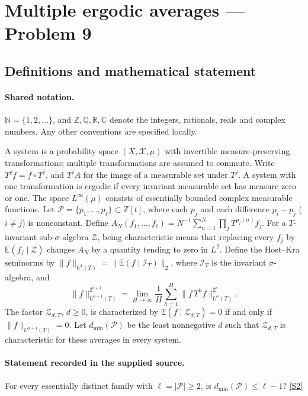 \documentclass[11pt]{article}
\newcommand{\sref}[2]{\hyperlink{source:#1:#2}{[S#2]}}
\begin{document}
\section{Multiple ergodic averages — Problem 9}\label{statement}

\subsection{Definitions and mathematical statement}

\paragraph{Shared notation.}$\mathbb N=\{1,2,\ldots\}$, and $\mathbb Z,\mathbb Q,\mathbb R,\mathbb C$ denote the integers, rationals, reals and complex numbers. Any other conventions are specified locally.


A system is a probability space $(X,\mathcal X,\mu)$ with invertible measure-preserving transformations; multiple transformations are assumed to commute. Write $T^j f=f\circ T^j$, and $T^j A$ for the image of a measurable set under $T^j$. A system with one transformation is ergodic if every invariant measurable set has measure zero or one. The space $L^\infty(\mu)$ consists of essentially bounded complex measurable functions. Let $\mathcal P=\{p_1,\ldots,p_\ell\}\subset\mathbb Z[t]$, where each $p_j$ and each difference $p_i-p_j$ ($i\ne j$) is nonconstant. Define $A_N(f_1,\ldots,f_\ell)=N^{-1}\sum_{n=1}^N\prod_jT^{p_j(n)}f_j$. For a $T$-invariant sub-$\sigma$-algebra $\mathcal Z$, being characteristic means that replacing every $f_j$ by $\mathbb E(f_j\mid\mathcal Z)$ changes $A_N$ by a quantity tending to zero in $L^2$. Define the Host--Kra seminorms by $\|f\|_{U^1(T)}=\|\mathbb E(f\mid\mathcal I_T)\|_2$, where $\mathcal I_T$ is the invariant $\sigma$-algebra, and \[\|f\|_{U^{s+1}(T)}^{2^{s+1}}=\lim_{H\to\infty}\frac1H\sum_{h=1}^H\|\bar f\,T^h f\|_{U^s(T)}^{2^s}.\] The factor $\mathcal Z_{d,T}$, $d\ge0$, is characterized by $\mathbb E(f\mid\mathcal Z_{d,T})=0$ if and only if $\|f\|_{U^{d+1}(T)}=0$. Let $d_{\min}(\mathcal P)$ be the least nonnegative $d$ such that $\mathcal Z_{d,T}$ is characteristic for these averages in every system.
\paragraph{Statement recorded in the supplied source.}
For every essentially distinct family with $\ell=|\mathcal P|\ge2$, is $d_{\min}(\mathcal P)\le\ell-1$? \sref{statement}{2}
\end{document}
